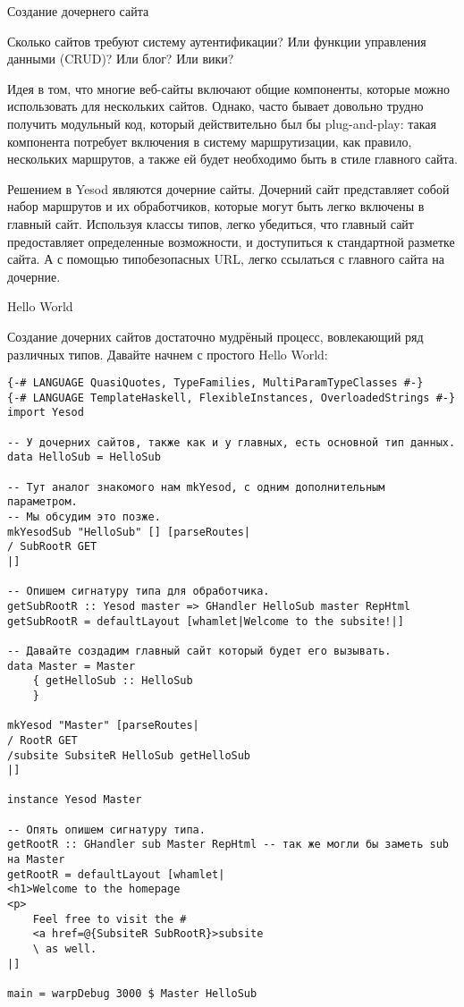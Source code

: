 Создание дочернего сайта

Сколько сайтов требуют систему аутентификации? Или функции управления данными (CRUD)? Или блог? Или вики?

Идея в том, что многие веб-сайты включают общие компоненты, которые можно использовать для нескольких сайтов. Однако, часто бывает довольно трудно получить модульный код, который действительно был бы plug-and-play: такая компонента потребует включения в систему маршрутизации, как правило, нескольких маршрутов, а также ей будет необходимо быть в стиле главного сайта.

Решением в Yesod являются дочерние сайты. Дочерний сайт представляет собой набор маршрутов и их обработчиков, которые могут быть легко включены в главный сайт. Используя классы типов, легко убедиться, что главный сайт предоставляет определенные возможности, и доступиться к стандартной разметке сайта. А с помощью типобезопасных URL, легко ссылаться с главного сайта на дочерние.

Hello World

Создание дочерних сайтов достаточно мудрёный процесс, вовлекающий ряд различных типов. Давайте начнем с простого Hello World:

\begin{lstlisting}
{-# LANGUAGE QuasiQuotes, TypeFamilies, MultiParamTypeClasses #-}
{-# LANGUAGE TemplateHaskell, FlexibleInstances, OverloadedStrings #-}
import Yesod

-- У дочерних сайтов, также как и у главных, есть основной тип данных.
data HelloSub = HelloSub

-- Тут аналог знакомого нам mkYesod, с одним дополнительным параметром.
-- Мы обсудим это позже.
mkYesodSub "HelloSub" [] [parseRoutes|
/ SubRootR GET
|]

-- Опишем сигнатуру типа для обработчика.
getSubRootR :: Yesod master => GHandler HelloSub master RepHtml
getSubRootR = defaultLayout [whamlet|Welcome to the subsite!|]

-- Давайте создадим главный сайт который будет его вызывать.
data Master = Master
    { getHelloSub :: HelloSub
    }

mkYesod "Master" [parseRoutes|
/ RootR GET
/subsite SubsiteR HelloSub getHelloSub
|]

instance Yesod Master

-- Опять опишем сигнатуру типа.
getRootR :: GHandler sub Master RepHtml -- так же могли бы заметь sub на Master
getRootR = defaultLayout [whamlet|
<h1>Welcome to the homepage
<p>
    Feel free to visit the #
    <a href=@{SubsiteR SubRootR}>subsite
    \ as well.
|]

main = warpDebug 3000 $ Master HelloSub
\end{lstlisting}

